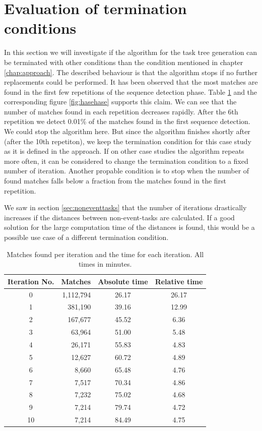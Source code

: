 \section{Evaluation of termination conditions}
In this section we will investigate if the algorithm for the task tree generation can be terminated with other conditions than the condition mentioned in chapter \ref{chap:approach}.
The described behaviour is that the algorithm stops if no further replacements could be performed. 
It has been observed that the most matches are found in the first few repetitions of the sequence detection phase.
Table \ref{tab:timesandmatchesperiteration} and the corresponding figure \ref{fig:hasehase} supports this claim. We can see that the number of matches found in each repetition decreases rapidly. 
After the 6th repetition we detect 0.01\% of the matches found in the first sequence detection. We could stop the algorithm here. But since the algorithm finishes shortly after (after the 10th repetiton), 
we keep the termination condition for this case study as it is defined in the approach. 
If on other case studies the algorithm repeats more often, it can be considered to change the termination condition to a fixed number of iteration.
Another propable condition is to stop when the number of found matches falls below a fraction from the matches found in the first repetition.

We saw in section \ref{sec:noneventtasks} that the number of iterations drastically increases if the distances between non-event-tasks are calculated. 
If a good solution for the large computation time of the distances is found, this would be a possible use case of a different termination condition.

\begin{table}[h!] 
		\centering
	\begin{tabular}{|c|r|c|c|}
		  \hline
		  \textbf{Iteration No.} & \textbf{Matches} & \textbf{Absolute time}& \textbf{Relative time} \\
		  \hline
     		    0  & 1,112,794 & 26.17 & 26.17\\
	            1  & 381,190   & 39.16 & 12.99\\
		    2  & 167,677   & 45.52 & 6.36\\
		    3  & 63,964    & 51.00 & 5.48\\
		    4  & 26,171    & 55.83 & 4.83\\
		    5  & 12,627    & 60.72 & 4.89\\
		    6  & 8,660     & 65.48 & 4.76\\
		    7  & 7,517     & 70.34 & 4.86\\
		    8  & 7,232     & 75.02 & 4.68\\
		    9  & 7,214     & 79.74 & 4.72\\
		    10 & 7,214     & 84.49 & 4.75\\
		  \hline
		   \end{tabular}
		   \caption{Matches found per iteration and the time for each iteration. All times in minutes.}
		   \label{tab:timesandmatchesperiteration}
	\end{table}

